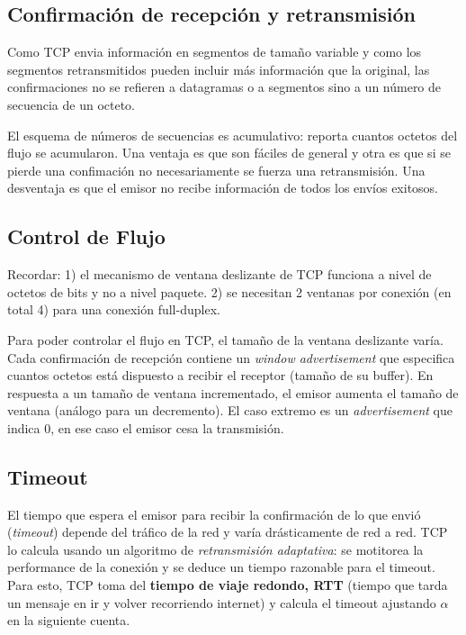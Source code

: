 \documentclass{book}
\begin{document}
	\subsection{Confirmación de recepción y retransmisión}
	Como TCP envia información en segmentos de tamaño variable y como los segmentos retransmitidos pueden incluir más información que la original, las confirmaciones no se refieren a datagramas o a segmentos sino a un número de secuencia de un octeto.
	
	\vspace{3mm}
	El esquema de números de secuencias es acumulativo: reporta cuantos octetos del flujo se acumularon. Una ventaja es que son fáciles de general y otra es que si se pierde una confimación no necesariamente se fuerza una retransmisión. Una desventaja es que el emisor no recibe información de todos los envíos exitosos.
	
	\subsection{Control de Flujo}
	\begin{center}
		Recordar: 1) el mecanismo de ventana deslizante de TCP funciona a nivel de octetos de bits y no a nivel paquete. 2) se necesitan 2 ventanas por conexión (en total 4) para una conexión full-duplex.
	\end{center}
	
	Para poder controlar el flujo en TCP, el tamaño de la ventana deslizante varía. Cada confirmación de recepción contiene un \textit{window advertisement} que especifica cuantos octetos está dispuesto a recibir el receptor (tamaño de su buffer). En respuesta a un tamaño de ventana incrementado, el emisor aumenta el tamaño de ventana (análogo para un decremento). El caso extremo es un \textit{advertisement} que indica 0, en ese caso el emisor cesa la transmisión.
	
	\pagebreak
	\subsection{Timeout}
	El tiempo que espera el emisor para recibir la confirmación de lo que envió (\textit{timeout}) depende del tráfico de la red y varía drásticamente de red a red. TCP lo calcula usando un algoritmo de \textit{retransmisión adaptativa}: se motitorea la performance de la conexión y se deduce un tiempo razonable para el timeout. Para esto, TCP toma del \textbf{tiempo de viaje redondo, RTT} (tiempo que tarda un mensaje en ir y volver recorriendo internet) y calcula el timeout ajustando $\alpha$ en la siguiente cuenta.
	
\end{document}
